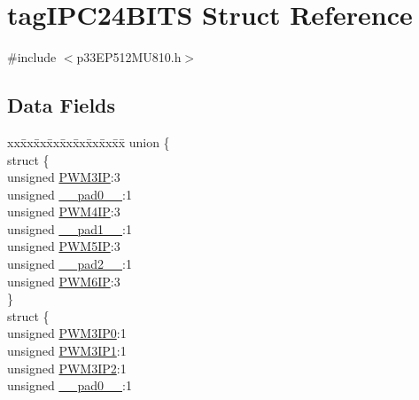 \hypertarget{structtag_i_p_c24_b_i_t_s}{}\section{tag\+I\+P\+C24\+B\+I\+TS Struct Reference}
\label{structtag_i_p_c24_b_i_t_s}


{\ttfamily \#include $<$p33\+E\+P512\+M\+U810.\+h$>$}

\subsection*{Data Fields}
\begin{DoxyCompactItemize}
\item 
\begin{tabbing}
xx\=xx\=xx\=xx\=xx\=xx\=xx\=xx\=xx\=\kill
union \{\\
\>struct \{\\
\>\>unsigned \hyperlink{structtag_i_p_c24_b_i_t_s_a0ae0ceb2a274458046785d99217974dd}{PWM3IP}:3\\
\>\>unsigned \hyperlink{structtag_i_p_c24_b_i_t_s_adf71f3d8410c1f1dbbc96680a92c49af}{\_\_pad0\_\_}:1\\
\>\>unsigned \hyperlink{structtag_i_p_c24_b_i_t_s_a36aea83b035a9822d45de46014d12ab5}{PWM4IP}:3\\
\>\>unsigned \hyperlink{structtag_i_p_c24_b_i_t_s_acaf2d0924a107ec6e8d2e31febaf66f9}{\_\_pad1\_\_}:1\\
\>\>unsigned \hyperlink{structtag_i_p_c24_b_i_t_s_ab4df3e9d90321e4ba286385711fd2688}{PWM5IP}:3\\
\>\>unsigned \hyperlink{structtag_i_p_c24_b_i_t_s_a4d97cc5f7d51d22fc2bf3eab35c9cb7f}{\_\_pad2\_\_}:1\\
\>\>unsigned \hyperlink{structtag_i_p_c24_b_i_t_s_adc54fe59b4c1cd4d54e747233de0ddc3}{PWM6IP}:3\\
\>\} \\
\>struct \{\\
\>\>unsigned \hyperlink{structtag_i_p_c24_b_i_t_s_a1e83d80e3664b1a08e63c5a4b10beebf}{PWM3IP0}:1\\
\>\>unsigned \hyperlink{structtag_i_p_c24_b_i_t_s_a97e7c9d64bf334929caf17dd158496dd}{PWM3IP1}:1\\
\>\>unsigned \hyperlink{structtag_i_p_c24_b_i_t_s_a33083f386c12921beaad423acb3e6baa}{PWM3IP2}:1\\
\>\>unsigned \hyperlink{structtag_i_p_c24_b_i_t_s_adf71f3d8410c1f1dbbc96680a92c49af}{\_\_pad0\_\_}:1\\

\end{tabbing}
\end{DoxyCompactItemize}
